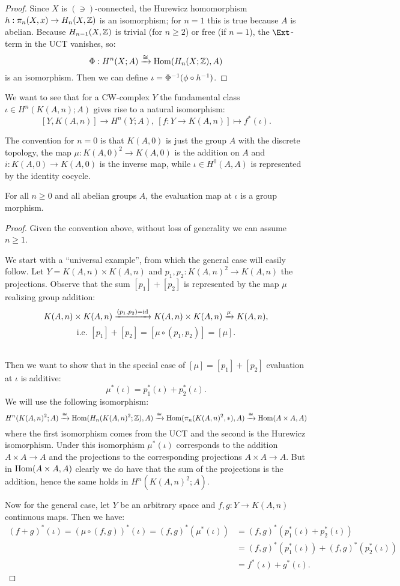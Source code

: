 \begin{proof}
Since $X$ is $(\ni)$-connected, the Hurewicz homomorphism $h:\pi_n(X,x)\to H_n(X,{\mathbb Z})$ is an isomorphism; for $n=1$ this is true because $A$ is abelian. Because $H_{n-1}(X,{\mathbb Z})$ is trivial (for $n\ge2$) or free (if $n=1$), the $\Ext$-term in the UCT vanishes, so:
\[\Phi:H^n(X;A)\xrightarrow{\cong}\operatorname{Hom}(H_n(X;{\mathbb Z}),A)\]
is an isomorphism. Then we can define $\iota=\Phi^\inv(\phi\circ h^\inv)$.
\end{proof}

We want to see that for a CW-complex $Y$ the fundamental class $\iota\in H^n(K(A,n);A)$ gives rise to a natural isomorphism:
\[
[Y,K(A,n)]\to H^n(Y;A),\ [f:Y\to K(A,n)]\mapsto f^*(\iota).
\]

The convention for $n=0$ is that $K(A,0)$ is just the group $A$ with the discrete topology, the map $\mu:K(A,0)^2\to K(A,0)$ is the addition on $A$ and $i: K(A,0)\to K(A,0)$ is the inverse map, while $\iota\in H^0(A,A)$ is represented by the identity cocycle.

\begin{theorem}
For all $n\ge0$ and all abelian groups $A$, the evaluation map at $\iota$ is a group morphism.
\end{theorem}

\begin{proof}
Given the convention above, without loss of generality we can assume $n\ge1$.

We start with a \enquote{universal example}, from which the general case will easily follow. Let $Y=K(A,n)\times K(A,n)$ and $p_1,p_2:K(A,n)^2\to K(A,n)$ the projections. Observe that the sum $[p_1]+[p_2]$ is represented by the map $\mu$ realizing group addition:
\[
K(A,n)\times K(A,n)\xrightarrow{(p_1,p_2)=\operatorname{id}}K(A,n)\times K(A,n)\xrightarrow{\mu}K(A,n),\]
\[\text{i.e. } [p_1]+[p_2]=[\mu\circ(p_1,p_2)]=[\mu].
\]\ 

Then we want to show that in the special case of $[\mu]=[p_1]+[p_2]$ evaluation at $\iota$ is additive:
\[\mu^*(\iota)=p_1^*(\iota)+p_2^*(\iota).\]
We will use the following isomorphism:
{\small
\[ H^n(K(A,n)^2;A)\xrightarrow{\cong}\operatorname{Hom}(H_n(K(A,n)^2;{\mathbb Z}),A)\xrightarrow{\cong}\operatorname{Hom}(\pi_n(K(A,n)^2,*),A)\xrightarrow{\cong}\operatorname{Hom}(A\times A,A)\]}
where the first isomorphism comes from the UCT and the second is the Hurewicz isomorphism. Under this isomorphism $\mu^*(\iota)$ corresponds to the addition $A\times A\to A$ and the projections to the corresponding projections $A\times A\to A$. But in $\operatorname{Hom}(A\times A,A)$ clearly we do have that the sum of the projections is the addition, hence the same holds in $H^n(K(A,n)^2;A)$.

Now for the general case, let $Y$ be an arbitrary space and $f,g:Y\to K(A,n)$ continuous maps. Then we have:
\begin{align*}
(f+g)^*(\iota)=(\mu\circ(f,g))^*(\iota)=(f,g)^*(\mu^*(\iota))&=(f,g)^*(p_1^*(\iota)+p_2^*(\iota))\\
&=(f,g)^*(p_1^*(\iota))+(f,g)^*(p_2^*(\iota))\\
&=f^*(\iota)+g^*(\iota).
\end{align*}
\end{proof}

